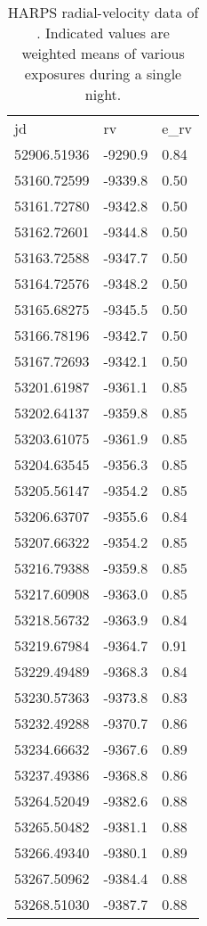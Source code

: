\begin{table}
\caption{HARPS radial-velocity data of  . Indicated values are weighted means of various exposures during a single night. \label{ta:harrvdata}} 
\par
\begin{tabular}{l l l}
\hline\hline
 {jd} &  {rv} &  {e_rv} \\ 
52906.51936	 & -9290.9	 &  0.84\\	
53160.72599	 & -9339.8	 &  0.50\\
53161.72780	 & -9342.8	 &  0.50\\
53162.72601	 & -9344.8	 &  0.50\\
53163.72588	 & -9347.7	 &  0.50\\
53164.72576	 & -9348.2	 &  0.50\\
53165.68275	 & -9345.5	 &  0.50\\	
53166.78196	 & -9342.7	 &  0.50\\	
53167.72693	 & -9342.1	 &  0.50\\	
53201.61987	 & -9361.1	 &  0.85\\	 
53202.64137	 & -9359.8	 &  0.85\\	 
53203.61075	 & -9361.9	 &  0.85\\	
53204.63545	 & -9356.3	 &  0.85\\	
53205.56147	 & -9354.2	 &  0.85\\	
53206.63707	 & -9355.6	 &  0.84\\
53207.66322	 & -9354.2	 &  0.85\\	 
53216.79388	 & -9359.8	 &  0.85\\
53217.60908	 & -9363.0	 &  0.85\\
53218.56732	 & -9363.9	 &  0.84\\
53219.67984	 & -9364.7	 &  0.91\\
53229.49489	 & -9368.3	 &  0.84\\
53230.57363	 & -9373.8	 &  0.83\\
53232.49288	 & -9370.7	 &  0.86\\
53234.66632	 & -9367.6	 &  0.89\\
53237.49386	 & -9368.8	 &  0.86\\
53264.52049	 & -9382.6	 &  0.88\\
53265.50482	 & -9381.1	 &  0.88\\
53266.49340	 & -9380.1	 &  0.89\\
53267.50962	 & -9384.4	 &  0.88\\
53268.51030	 & -9387.7	 &  0.88\\

\end{tabular}
\end{table}
